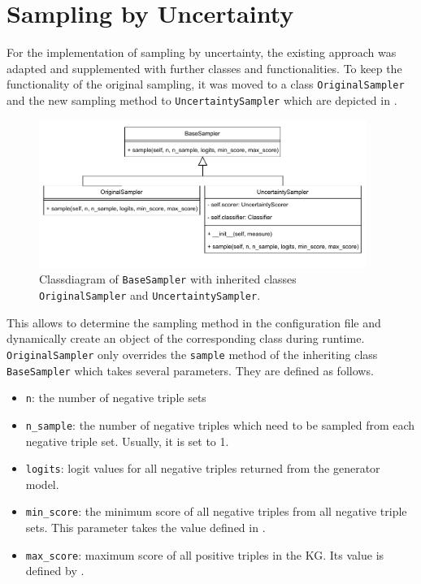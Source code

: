 \section{Sampling by Uncertainty}
\label{sec:sampling_by_uncertainty}
For the implementation of sampling by uncertainty, the existing approach was adapted and supplemented with further classes and functionalities.
To keep the functionality of the original sampling, it was moved to a class \texttt{OriginalSampler} and the new sampling method to \texttt{UncertaintySampler} which are depicted in .
\begin{figure}[H]
  \centering
    \includegraphics[width=0.95\textwidth]{figures/classdiagrams/BaseSampler.pdf}
    \caption{Classdiagram of \texttt{BaseSampler} with inherited classes \texttt{OriginalSampler} and \texttt{UncertaintySampler}.}
  \label{fig:base_sampler}
\end{figure}
This allows to determine the sampling method in the configuration file and dynamically create an object of the corresponding class during runtime.
\texttt{OriginalSampler} only overrides the \texttt{sample} method of 
the inheriting class \texttt{BaseSampler} which takes several parameters.
They are defined as follows.
\begin{itemize}
    \item 
    \texttt{n}: the number of negative triple sets
    
    \item 
    \texttt{n\_sample}: 
    the number of negative triples which need to be sampled from each negative triple set.
    Usually, it is set to 1.
    
    \item 
    \texttt{logits}:
    logit values for all negative triples returned from the generator model.
    
    \item 
    \texttt{min\_score}:
    the minimum score of all negative triples from all negative triple sets.
    This parameter takes the value defined in .
    
    \item 
    \texttt{max\_score}:
    maximum score of all positive triples in the \ac{KG}.
    Its value is defined by .
    
\end{itemize}

